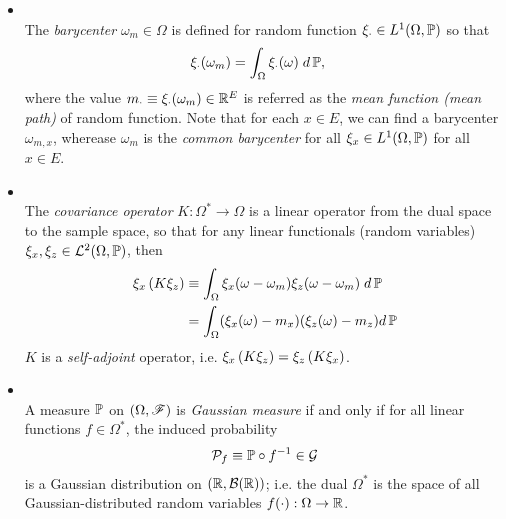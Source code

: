 \documentclass[11pt]{article}
\begin{document}
\begin{itemize}
\item \begin{definition} \citep{lifshits2013gaussian}\\
The \emph{barycenter} $\omega_{m}\in \Omega$ is defined for random function $\xi_{\cdot} \in L^{1}(\Omega, {\mathbb P})$ so that
\begin{align*}
\xi_{\cdot}(\omega_{m}) &= \int_{\Omega}\xi_{\cdot }(\omega) \;d\,{\mathbb P}, 
\end{align*}
where the value $m_{\cdot} \equiv \xi_{\cdot}(\omega_{m})\in {\mathbb R}^{E}$ is referred as the \emph{mean function (mean path)} of random function. Note that for each $x\in E$, we can find a barycenter $\omega_{m,x}$, wherease $\omega_{m}$ is the  \emph{common barycenter} for all $\xi_{x} \in L^{1}(\Omega, {\mathbb P})$ for all $x\in E$. \\
\end{definition}

\item  \begin{definition} \citep{lifshits2013gaussian}\\
The \emph{covariance operator} $K:  \Omega^{*} \rightarrow \Omega$ is a linear operator from the dual space to the sample space, so that for any  linear functionals (random variables) $\xi_{x}, \xi_{z} \in {\mathcal L}^{2}(\Omega, {\mathbb P})$, then
\begin{align*}
\xi_{x}\left(K \xi_{z}\right) &\equiv \int_{\Omega}\xi_{x}(\omega - \omega_{m})\xi_{z}(\omega - \omega_{m})\;d\,{\mathbb P}\\
&= \int_{\Omega} (\xi_{x}(\omega) - m_{x})(\xi_{z}(\omega) - m_{z}) d\,{\mathbb P}
\end{align*}
$K$ is a \emph{self-adjoint} operator, i.e. $\xi_{x}\left(K \xi_{z}\right) = \xi_{z}\left(K \xi_{x}\right)$.  \\[10pt]
\end{definition}

\item \begin{definition}\citep{lifshits2013gaussian}\\
A measure ${\mathbb P}$ on $(\Omega, {\mathscr F})$ is \emph{Gaussian measure} if and only if for all linear functions $f\in \Omega^{*}$, the induced probability 
\begin{align*}
{\mathcal P}_{f}\equiv {\mathbb P}\circ f^{-1} \in {\mathcal G}
\end{align*} is a Gaussian distribution on $({\mathbb R}, {\mathcal B}({\mathbb R}))$; i.e. the dual $\Omega^{*}$ is the space of all  Gaussian-distributed random variables $f(\cdot): \Omega \rightarrow {\mathbb R}$.
\end{definition}
\end{itemize}
\end{document}
